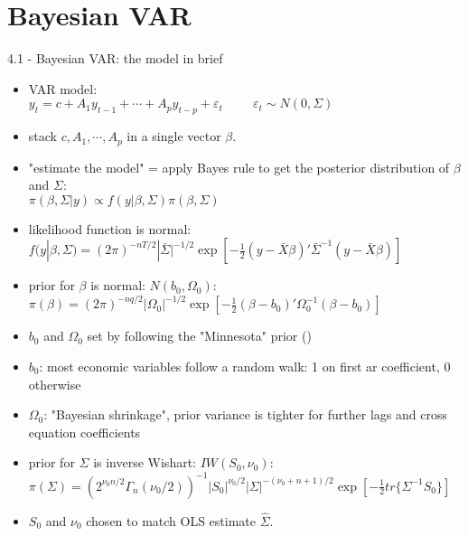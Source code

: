 \section{Bayesian VAR}

\begin{frame}{4.1 - Bayesian VAR: the model in brief}
\begin{itemize}
	\item VAR model: \\
	$y_t = c + A_1 y_{t-1} + \cdots + A_p y_{t-p} + \varepsilon_t \hspace{1cm} \varepsilon_t \sim N(0, \Sigma)$ \\
	\item stack $c, A_1, \cdots, A_p$ in a single vector $\beta$.
	\item "estimate the model" = apply Bayes rule to get the posterior distribution of $\beta$ and $\Sigma$: \\
	$\pi(\beta, \Sigma| y) \propto f(y|\beta, \Sigma) \pi(\beta, \Sigma)$
	\item likelihood function is normal: \\
	$f(y| \beta, \Sigma) = (2 \pi)^{-nT/2} |\bar{\Sigma}|^{-1/2} \exp \left[ -\frac{1}{2} (y-\bar{X} \beta)' \bar{\Sigma}^{-1} (y-\bar{X} \beta) \right]$
\end{itemize}
\end{frame}


\begin{frame}
	\begin{itemize}
		\item prior for $\beta$ is normal: $N(b_0, \Omega_0)$: \\
		$\pi(\beta) = (2 \pi)^{-nq/2} |\Omega_0|^{-1/2} \exp \left[ -\frac{1}{2} (\beta - b_0)' \Omega_0^{-1} (\beta - b_0) \right]$
		\item $b_0$ and $\Omega_0$ set by following the "Minnesota" prior (\cite{Litterman1986})
		\item $b_0$: most economic variables follow a random walk: 1 on first ar coefficient, 0 otherwise
		\item $\Omega_0$: "Bayesian shrinkage", prior variance is tighter for further lags and cross equation coefficients
	\end{itemize}
	\pause
	\begin{itemize}	
		\item prior for $\Sigma$ is inverse Wishart: $IW(S_0, \nu_0)$: \\
		$\pi(\Sigma) = (2^{\nu_0 n /2} \Gamma_n(\nu_0/2))^{-1} |S_0|^{\nu_0/2} |\Sigma|^{-(\nu_0+n+1)/2} \exp \left[ - \frac{1}{2} tr \{ \Sigma^{-1} S_0 \}  \right]$
		\item $S_0$ and $\nu_0$ chosen to match OLS estimate $\hat{\Sigma}$.
	\end{itemize}
\end{frame}


